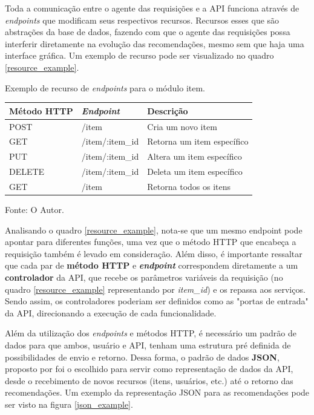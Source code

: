 \documentclass[12pt, openright, oneside, a4paper, brazil]{abntex2}
\begin{document}
Toda a comunicação entre o agente das requisições e a API funciona através de \textit{endpoints} que modificam seus respectivos recursos. Recursos esses que são abstrações da base de dados, fazendo com que o agente das requisições possa interferir diretamente na evolução das recomendações, mesmo sem que haja uma interface gráfica. Um exemplo de recurso pode ser visualizado no quadro \ref{resource_example}.

\begin{quadro}[h!tp]

	\caption{\label{resource_example}Exemplo de recurso de \textit{endpoints} para o módulo item.}
	\centering
	\begin{tabular}{|l|l|l|}
	\hline
	\textbf{Método HTTP} & \textit{\textbf{Endpoint}} & \textbf{Descrição}         \\ \hline
	POST                 & /item                      & Cria um novo item           \\ \hline
	GET                  & /item/:item\_id 			  & Retorna um item específico  \\ \hline
	PUT                  & /item/:item\_id            & Altera um item específico  \\ \hline
	DELETE               & /item/:item\_id            & Deleta um item específico  \\ \hline
	GET                  & /item                      & Retorna todos os itens      \\ \hline
	\end{tabular}

	Fonte: O Autor.

\end{quadro}

Analisando o quadro \ref{resource_example}, nota-se que um mesmo endpoint pode apontar para diferentes funções, uma vez que o método HTTP que encabeça a requisição também é levado em consideração. Além disso, é importante ressaltar que cada par de \textbf{método HTTP} e \textbf{\textit{endpoint}} correspondem diretamente a um \textbf{controlador} da API, que recebe os parâmetros variáveis da requisição (no quadro \ref{resource_example} representando por \textit{item\_id}) e os repassa aos serviços. Sendo assim, os controladores poderiam ser definidos como as "portas de entrada" da API, direcionando a execução de cada funcionalidade. 

Além da utilização dos \textit{endpoints} e métodos HTTP, é necessário um padrão de dados para que ambos, usuário e API, tenham uma estrutura pré definida de possibilidades de envio e retorno. Dessa forma, o padrão de dados \textbf{JSON}, proposto por  foi o escolhido para servir como representação de dados da API, desde o recebimento de novos recursos (itens, usuários, etc.) até o retorno das recomendações. Um exemplo da representação JSON para as recomendações pode ser visto na figura \ref{json_example}.
\end{document}
